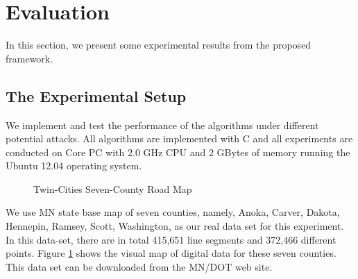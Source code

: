 \section{Evaluation}
\label{sec:exper}


In this section, we present some experimental results
from the proposed framework.

\subsection{The Experimental Setup}
We implement and test the performance of the algorithms 
under different potential attacks.
All algorithms are implemented with C and all
experiments are conducted on Core PC with 2.0 GHz
CPU and 2 GBytes of memory running the Ubuntu 12.04 operating system.

\begin{figure}[ht]
\centering
{}
\caption{Twin-Cities Seven-County Road Map}
\label{fig:region}
\end{figure}


We use MN state base 
map of seven counties, namely, Anoka, Carver, Dakota, Hennepin, Ramsey, Scott, 
Washington, as our real data set for this experiment. 
In this data-set, there are in total 415,651 line segments
and 372,466 different points. Figure \ref{fig:region} shows the visual map
of digital data for these seven counties. This data set can
be downloaded from the MN/DOT web site\cite{mndoturl}. 


